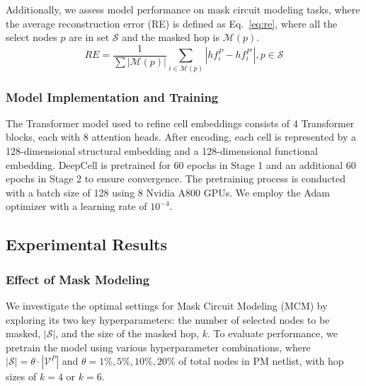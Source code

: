 Additionally, we assess model performance on mask circuit modeling tasks, where the average reconstruction error (RE) is defined as Eq.~\eqref{eq:re}, where all the select nodes $p$ are in set $\mathcal{S}$ and the masked hop is $\mathcal{M}(p)$. 
\begin{equation} \label{eq:re}
    RE = \frac{1}{\sum|\mathcal{M}(p)|}\sum_{i\in \mathcal{M}(p)}|hf_i^P-hf_i^{P'}|, p\in\mathcal{S} 
\end{equation}

\subsubsection{Model Implementation and Training}
The Transformer model used to refine cell embeddings consists of 4 Transformer blocks, each with 8 attention heads. After encoding, each cell is represented by a 128-dimensional structural embedding and a 128-dimensional functional embedding. DeepCell is pretrained for 60 epochs in Stage 1 and an additional 60 epochs in Stage 2 to ensure convergence. The pretraining process is conducted with a batch size of 128 using 8 Nvidia A800 GPUs. We employ the Adam optimizer with a learning rate of $10^{-4}$. 

\subsection{Experimental Results}
\subsubsection{Effect of Mask Modeling}
We investigate the optimal settings for Mask Circuit Modeling (MCM) by exploring its two key hyperparameters: the number of selected nodes to be masked, $|\mathcal{S}|$, and the size of the masked hop, $k$. To evaluate performance, we pretrain the model using various hyperparameter combinations, where $\mathcal{|S|}=\theta \cdot |\mathcal{V}^P|$ and $\theta = 1\%, 5\%, 10\%, 20\%$ of total nodes in PM netlist, with hop sizes of $k=4$ or $k=6$. 

